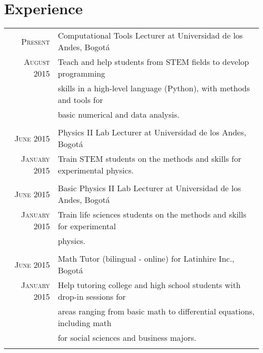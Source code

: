 \documentclass[a4paper,10pt]{article} %
\begin{document}

\color{OrangeRed}
\section{Experience}
\color{black}

\begin{tabular}{rl}

\textsc{Present} & Computational Tools Lecturer at Universidad de los Andes, Bogot\'a  \\ 
\textsc{August 2015} & Teach and help students from STEM fields to develop programming  \\ & skills in a high-level language (Python), with methods and tools for  \\ & basic numerical and data analysis. \\
\\

\textsc{June 2015} & Physics II Lab Lecturer at Universidad de los Andes, Bogot\'a  \\ 
\textsc{January 2015} & Train STEM students on the methods and skills for experimental physics.\\
\\

\textsc{June 2015} & Basic Physics II Lab Lecturer at Universidad de los Andes, Bogot\'a \\ 
\textsc{January 2015} & Train life sciences students on the methods and skills for experimental  \\ & physics.\\
\\

\textsc{June 2015} & Math Tutor (bilingual - online) for Latinhire Inc., Bogot\'a\\ 
\textsc{January 2015} & Help tutoring college and high school students with drop-in sessions for \\ & areas ranging from basic math to differential equations, including math  \\ & for social sciences and business majors. \\
\\

\end{tabular}


\newpage


\end{document}
